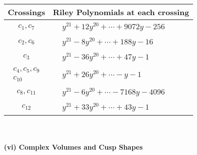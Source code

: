 \documentclass[1p]{elsarticle_modified}
\theoremstyle{definition}
\begin{document}
\begin{tabular}{m{50pt}|m{274pt}}
Crossings & \hspace{64pt}Riley Polynomials at each crossing \\
\hline $$\begin{aligned}c_{1},c_{7}\end{aligned}$$&$\begin{aligned}
&y^{21}+12 y^{20}+\cdots+9072 y-256
\end{aligned}$\\
\hline $$\begin{aligned}c_{2},c_{6}\end{aligned}$$&$\begin{aligned}
&y^{21}-8 y^{20}+\cdots+188 y-16
\end{aligned}$\\
\hline $$\begin{aligned}c_{3}\end{aligned}$$&$\begin{aligned}
&y^{21}-36 y^{20}+\cdots+47 y-1
\end{aligned}$\\
\hline $$\begin{aligned}c_{4},c_{5},c_{9}\\c_{10}\end{aligned}$$&$\begin{aligned}
&y^{21}+26 y^{20}+\cdots- y-1
\end{aligned}$\\
\hline $$\begin{aligned}c_{8},c_{11}\end{aligned}$$&$\begin{aligned}
&y^{21}-6 y^{20}+\cdots-7168 y-4096
\end{aligned}$\\
\hline $$\begin{aligned}c_{12}\end{aligned}$$&$\begin{aligned}
&y^{21}+33 y^{20}+\cdots+43 y-1
\end{aligned}$\\
\hline
\end{tabular}\\~\\
\newpage\flushleft \textbf{(vi) Complex Volumes and Cusp Shapes}
\end{document}

